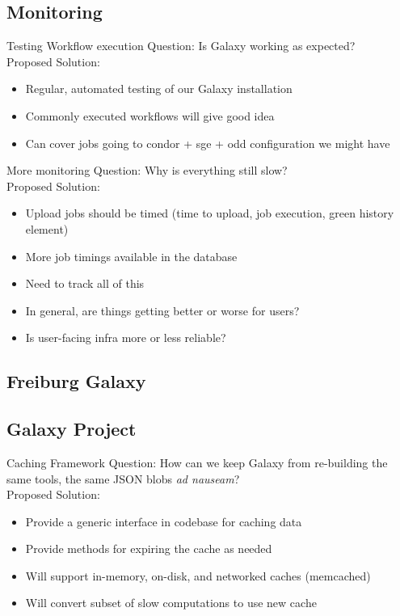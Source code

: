 \documentclass[12pt]{ufrslides}
\begin{document}
\subsection{Monitoring}

	\begin{frame}{Testing Workflow execution}
		Question: Is Galaxy working as expected? \\[0.6cm]
		Proposed Solution:
		\begin{itemize}
			\item Regular, automated testing of our Galaxy installation
			\item Commonly executed workflows will give good idea
			\item Can cover jobs going to condor + sge + odd configuration we might have
		\end{itemize}
	\end{frame}

	\begin{frame}{More monitoring}
		Question: Why is everything still slow? \\[0.6cm]
		Proposed Solution:
		\begin{itemize}
			\item Upload jobs should be timed (time to upload, job execution, green history element)
			\item More job timings available in the database
			\item Need to track all of this
			\item In general, are things getting better or worse for users?
			\item Is user-facing infra more or less reliable?
		\end{itemize}
	\end{frame}

\subsection{Freiburg Galaxy}

\subsection{Galaxy Project}

	\begin{frame}{Caching Framework}
		Question: How can we keep Galaxy from re-building the same tools, the same JSON blobs \textit{ad nauseam}?\\[0.6cm]
		Proposed Solution:
		\begin{itemize}
			\item Provide a generic interface in codebase for caching data
			\item Provide methods for expiring the cache as needed
			\item Will support in-memory, on-disk, and networked caches (memcached)
			\item Will convert subset of slow computations to use new cache
		\end{itemize}
	\end{frame}
\end{document}

